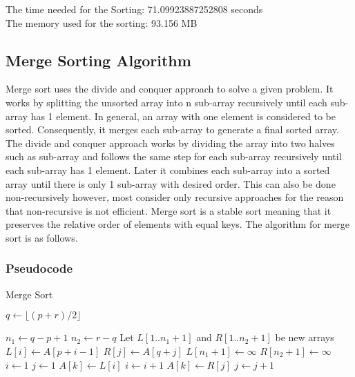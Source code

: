 \documentclass{article}
\begin{document}
The time needed for the Sorting: 71.09923887252808 seconds\\
The memory used for the sorting: 93.156 MB



\subsection{Merge Sorting Algorithm}

Merge sort uses the divide and conquer approach to solve a given problem. It
works by splitting the unsorted array into n sub-array recursively until each sub-array has 1 element. In general, an array with one element is considered to be
sorted. Consequently, it merges each sub-array to generate a final sorted array. The
divide and conquer approach works by dividing the array into two halves such as
sub-array and follows the same step for each sub-array recursively until each sub-array has 1 element. Later it combines each sub-array into a sorted array until there
is only 1 sub-array with desired order. This can also be done non-recursively
however, most consider only recursive approaches for the reason that non-recursive
is not efficient. Merge sort is a stable sort meaning that it preserves the relative
order of elements with equal keys. The algorithm for merge sort is as follows.\cite{elkahlout2017comparative}

\subsubsection{Pseudocode}

\begin{algorithm}[H]
\caption{Merge Sort}
\begin{algorithmic}[1]
        \State $q \gets \lfloor(p + r) / 2\rfloor$
        \State {}
        \State {}
        \State {}
    \EndIf
\EndFunction

    \State $n_1 \gets q - p + 1$
    \State $n_2 \gets r - q$
    \State Let $L[1..n_1 + 1]$ and $R[1..n_2 + 1]$ be new arrays
        \State $L[i] \gets A[p + i - 1]$
    \EndFor
        \State $R[j] \gets A[q + j]$
    \EndFor
    \State $L[n_1 + 1] \gets \infty$
    \State $R[n_2 + 1] \gets \infty$
    \State $i \gets 1$
    \State $j \gets 1$
            \State $A[k] \gets L[i]$
            \State $i \gets i + 1$
        \Else
            \State $A[k] \gets R[j]$
            \State $j \gets j + 1$
        \EndIf
    \EndFor
\EndFunction
\end{algorithmic}
\end{algorithm}
\newpage
\end{document}
